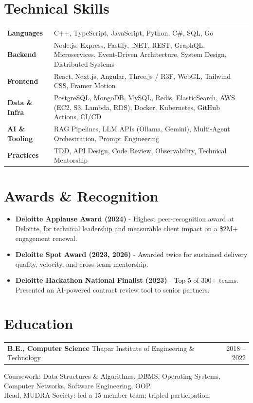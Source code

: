 \documentclass[10pt,letterpaper]{article}
\makeatletter
\newcommand{\projectheader}[3]{%
  \begin{tabularx}{\textwidth}{@{}Xr@{}}
    \textbf{#1} {\color{accent}\textbar{} #2} & {\color{accent}#3} \\
  \end{tabularx}\vspace{2pt}
}
\makeatother
\begin{document}
\section*{Technical Skills}

\begin{tabularx}{\textwidth}{@{}lX@{}}
  \textbf{Languages}      & C++, TypeScript, JavaScript, Python, C\#, SQL, Go \\
  \textbf{Backend}        & Node.js, Express, Fastify, .NET, REST, GraphQL, Microservices, Event-Driven Architecture, System Design, Distributed Systems \\
  \textbf{Frontend}       & React, Next.js, Angular, Three.js / R3F, WebGL, Tailwind CSS, Framer Motion \\
  \textbf{Data \& Infra}  & PostgreSQL, MongoDB, MySQL, Redis, ElasticSearch, AWS (EC2, S3, Lambda, RDS), Docker, Kubernetes, GitHub Actions, CI/CD \\
  \textbf{AI \& Tooling}  & RAG Pipelines, LLM APIs (Ollama, Gemini), Multi-Agent Orchestration, Prompt Engineering \\
  \textbf{Practices}      & TDD, API Design, Code Review, Observability, Technical Mentorship \\
\end{tabularx}

\section*{Awards \& Recognition}

\begin{itemize}
  \item \textbf{Deloitte Applause Award (2024)} - Highest peer-recognition award
        at Deloitte, for technical leadership and measurable client impact on
        a \$2M+ engagement renewal.
  \item \textbf{Deloitte Spot Award (2023, 2026)} - Awarded twice for sustained
        delivery quality, velocity, and cross-team mentorship.
  \item \textbf{Deloitte Hackathon National Finalist (2023)} - Top 5 of 300+
        teams. Presented an AI-powered contract review tool to senior partners.
\end{itemize}

\section*{Education}

\projectheader{B.E., Computer Science}{Thapar Institute of Engineering \& Technology}{2018 -- 2022}

Coursework: Data Structures \& Algorithms, DBMS, Operating Systems,
Computer Networks, Software Engineering, OOP. \\
Head, MUDRA Society: led a 15-member team; tripled participation.
\end{document}
